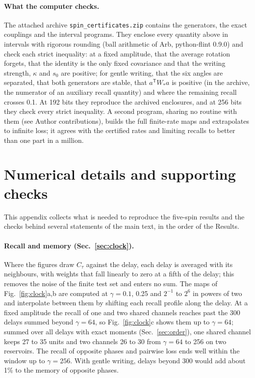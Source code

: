 \paragraph{What the computer checks.}
The attached archive \texttt{spin\_certificates.zip} contains the generators, the exact couplings and the interval
programs. They enclose every quantity above in intervals with rigorous rounding (ball arithmetic of Arb, python-flint
0.9.0) and check each strict inequality: at a fixed amplitude, that the average rotation forgets, that the identity is
the only fixed covariance and that the writing strength, $\kappa$ and $s_0$ are positive; for gentle writing, that the
six angles are separated, that both generators are stable, that $a^{\mathsf T}W_*a$ is positive (in the archive, the
numerator of an auxiliary recall quantity) and where the remaining recall crosses 0.1. At 192 bits they reproduce the
archived enclosures, and at 256 bits they check every strict inequality. A second program, sharing no routine with
them (see Author contributions), builds the full finite-rate maps and extrapolates to infinite loss; it agrees with
the certified rates and limiting recalls to better than one part in a million.

\section{Numerical details and supporting checks}
\label{app:numerics}
This appendix collects what is needed to reproduce the five-spin results and the checks behind several statements of
the main text, in the order of the Results.

\paragraph{Recall and memory (Sec.~\ref{sec:clock}).}
Where the figures draw $C_\tau$ against the delay, each delay is averaged with its neighbours, with weights that fall
linearly to zero at a fifth of the delay; this removes the noise of the finite test set and enters no sum. The maps of
Fig.~\ref{fig:clock}a,b are computed at $\gamma=0.1$, 0.25 and $2^{-1}$ to $2^6$ in powers of two and interpolate
between them by shifting each recall profile along the delay. At a fixed amplitude the recall of one and two shared
channels reaches past the 300 delays summed beyond $\gamma=64$, so Fig.~\ref{fig:clock}c shows them up to
$\gamma=64$; summed over all delays with exact moments (Sec.~\ref{sec:order}), one shared channel keeps 27 to 35
units and two channels 26 to 30 from $\gamma=64$ to 256 on two reservoirs. The recall of opposite phases and pairwise
loss ends well within the window up to $\gamma=256$. With gentle writing, delays beyond 300 would add about 1\% to the
memory of opposite phases.

